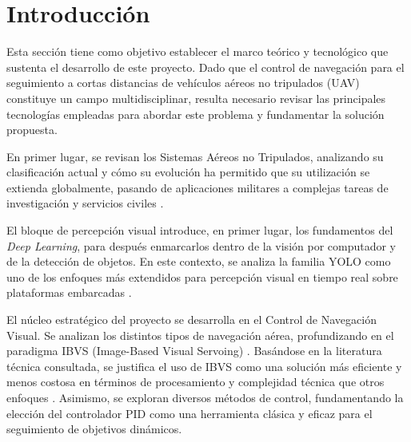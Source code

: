 
\clearpage


\par
\vspace{0.2cm} 
\noindent\HRule\par

\vspace*{0.8cm} %
\section{Introducción}

Esta sección tiene como objetivo establecer el marco teórico y tecnológico que sustenta el desarrollo de este proyecto. Dado que el control de navegación para el seguimiento a cortas distancias de vehículos aéreos no tripulados (UAV) constituye un campo multidisciplinar, resulta necesario revisar las principales tecnologías empleadas para abordar este problema \cite{yang2024high} y fundamentar la solución propuesta.

\vspace{0.4cm}

En primer lugar, se revisan los Sistemas Aéreos no Tripulados, analizando su clasificación actual y cómo su evolución ha permitido que su utilización se extienda globalmente, pasando de aplicaciones militares a complejas tareas de investigación y servicios civiles \cite{ClasDron1,ClasDron2}.

\vspace{0.4cm}

El bloque de percepción visual introduce, en primer lugar, los fundamentos del \textit{Deep Learning}, para después enmarcarlos dentro de la visión por computador y de la detección de objetos. En este contexto, se analiza la familia YOLO como uno de los enfoques más extendidos para percepción visual en tiempo real sobre plataformas embarcadas \cite{zheng2021air}.

\vspace{0.4cm}

El núcleo estratégico del proyecto se desarrolla en el Control de Navegación Visual. Se analizan los distintos tipos de navegación aérea, profundizando en el paradigma IBVS (Image-Based Visual Servoing) \cite{wikipediaVisualServoing}. Basándose en la literatura técnica consultada, se justifica el uso de IBVS como una solución más eficiente y menos costosa en términos de procesamiento y complejidad técnica que otros enfoques \cite{yang2024high, yan2024precise}. Asimismo, se exploran diversos métodos de control, fundamentando la elección del controlador PID como una herramienta clásica y eficaz para el seguimiento de objetivos dinámicos.

